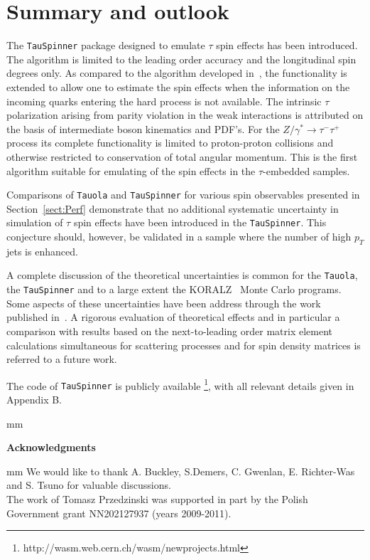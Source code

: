 \documentclass[12pt]{article}
\def\Ztautau{\ensuremath{Z/\gamma^{*}\to\tau^{-}\tau^{+}}\xspace}
\def\Tau{\ensuremath{\tau}\xspace}
\begin{document}
\section{Summary and outlook}\label{sect:Summary}


The {\tt TauSpinner} package designed to emulate \Tau spin effects has
been introduced. The algorithm is limited to the leading order accuracy and
the longitudinal spin degrees only. As compared to the algorithm developed in~\cite{TauSpinERWZW}, the
functionality is extended to allow one to estimate the spin effects when the
information on the incoming quarks entering the hard process is not
available. The intrinsic \Tau polarization arising from parity violation in the weak interactions
is attributed on the basis of intermediate boson kinematics and PDF's.
For the \Ztautau process its complete functionality is limited to proton-proton collisions
and otherwise restricted to conservation of total angular momentum. 
This is the first algorithm suitable for emulating of the spin effects
in the $\tau$-embedded samples.


Comparisons of {\tt Tauola} and {\tt TauSpinner} for various spin observables
presented in Section~\ref{sect:Perf} demonstrate 
that no additional systematic uncertainty in simulation of 
\Tau spin effects have been introduced in the {\tt TauSpinner}. 
This conjecture should, however, be validated in a sample
where the number of high $p_T$ jets is enhanced.


A complete discussion of the theoretical uncertainties
is common for the {\tt Tauola}, the {\tt TauSpinner} and to a large extent
the KORALZ~\cite{Jadach:1993yv} Monte Carlo programs.
Some aspects of these uncertainties have been address through
the work published in~\cite{TAUOLA1,TAUOLA2,TAUOLA3,Jadach:1984iy,Jadach:1999vf,vanHameren:2008dy}.
A rigorous evaluation of theoretical effects and in particular a comparison
with results based on the next-to-leading order matrix element calculations
simultaneous for scattering processes and
for spin density matrices is referred to a future work.


The code of {\tt TauSpinner} is publicly available
\footnote{http://wasm.web.cern.ch/wasm/newprojects.html},
with all relevant details given in
Appendix B. 

 mm
\centerline{\bf Acknowledgments}
 mm
We would like to thank A. Buckley, S.Demers, C. Gwenlan, E. Richter-Was and S. Tsuno
for valuable discussions. \\
{ The work of Tomasz Przedzinski was supported in
 part by the Polish Government grant NN202127937 (years 2009-2011).}
\end{document}
